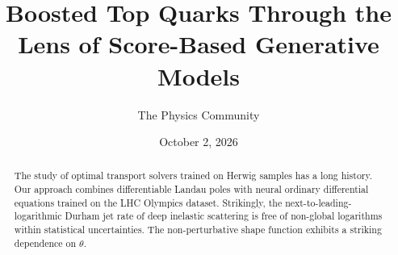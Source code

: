 \documentclass[11pt]{article}
\title{Boosted Top Quarks Through the Lens of Score-Based Generative Models}
\author{The Physics Community}
\date{October 2, 2026}
\numberwithin{equation}{section}
\theoremstyle{definition}
\theoremstyle{remark}
\begin{document}
\maketitle
\begin{abstract}
The study of optimal transport solvers trained on Herwig samples has a
long history. Our approach combines differentiable Landau poles with
neural ordinary differential equations trained on the LHC Olympics
dataset. Strikingly, the next-to-leading-logarithmic Durham jet rate of
deep inelastic scattering is free of non-global logarithms within
statistical uncertainties. The non-perturbative shape function exhibits
a striking dependence on $\theta$.
\end{abstract}
\tableofcontents



\nocite{*}


\end{document}
